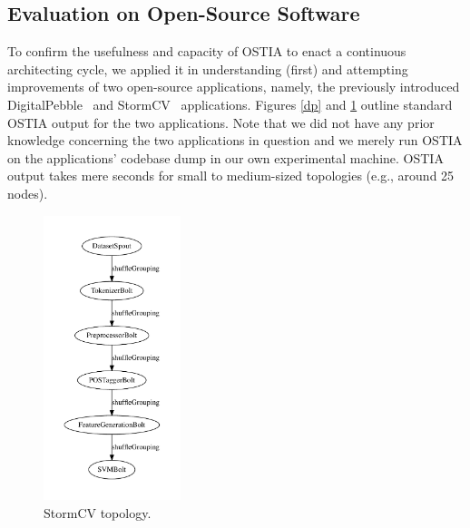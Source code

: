 \subsection{Evaluation on Open-Source Software}\label{os}

To confirm the usefulness and capacity of OSTIA to enact a continuous
architecting cycle, we applied it in understanding (first) and attempting
improvements of two open-source applications, namely, the previously introduced
DigitalPebble~\cite{digitalpebble} and 
StormCV~\cite{stormCV}
applications. Figures \ref{dp} and \ref{scv} outline standard OSTIA output for the two applications. Note that we did not have any prior knowledge concerning the two applications in question and we merely run OSTIA on the applications' codebase dump in our own experimental machine. OSTIA output takes mere seconds for small to medium-sized topologies (e.g., around 25 nodes). 
%
\begin{figure}
\begin{center}
\includegraphics[width=4cm]{images/output/senti_storm}
		\caption{StormCV topology.}
		\label{scv}
		\end{center}
\end{figure}

